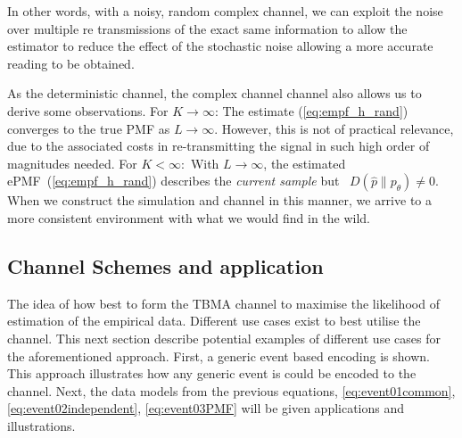 \documentclass{article}
\begin{document}
In other words, with a noisy, random complex channel, we can exploit the noise over multiple re transmissions of the exact same information to allow the estimator to reduce the effect of the stochastic noise allowing a more accurate reading to be obtained. 

As the deterministic channel, the complex channel channel also allows us to derive some observations. For $K \rightarrow \infty$: The estimate (\ref{eq:empf_h_rand}) converges to the true PMF as $L \rightarrow \infty$. However, this is not of practical relevance, due to the associated costs in re-transmitting the signal in such high order of magnitudes needed. For $K <\infty:$ With $L \rightarrow \infty$, the estimated ePMF~(\ref{eq:empf_h_rand}) describes the \emph{current sample} but ~$D(\hat{p}\| p_{\theta}) \neq 0$. When we construct the simulation and channel in this manner, we arrive to a more consistent environment with what we would find in the wild.

\subsection{Channel Schemes and application} \label{schemas_and_channels}
The idea of how best to form the TBMA channel to maximise the likelihood of estimation of the empirical data. Different use cases exist to best utilise the channel. This next section describe potential examples of different use cases for the aforementioned approach. First, a generic event based encoding is shown. This approach illustrates how any generic event is could be encoded to the channel. Next, the data models from the previous equations, \ref{eq:event01common},\ref{eq:event02independent}, \ref{eq:event03PMF} will be given applications and illustrations.  
\end{document}
